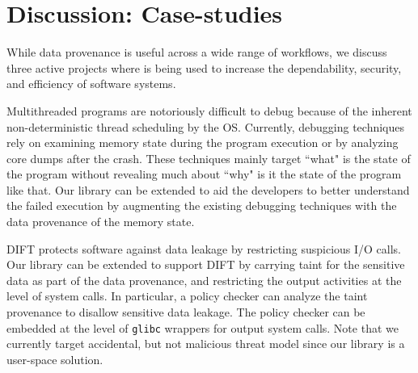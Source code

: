 \section{Discussion: Case-studies}
\label{sec:discussion}
While data provenance is useful across a wide range of workflows, we discuss three active projects where \projecttitle is being used to increase the dependability, security, and efficiency of software systems. 

 Multithreaded programs are notoriously difficult to debug because of the inherent non-deterministic thread scheduling by the OS.  Currently, debugging techniques rely on examining memory state during the program execution or by analyzing core dumps after the crash. These techniques mainly target ``what" is the state of the program without revealing much about ``why" is it the state of the program like that. Our library can be extended to aid the developers to better understand the failed execution by augmenting the existing debugging techniques with the data provenance of the memory state.


%
%
%


 DIFT protects software against data leakage by restricting suspicious I/O calls. Our library can be extended to support DIFT by carrying taint for the sensitive data as part of the data provenance, and  restricting the output activities at the level of system calls. In particular, a policy checker can analyze the taint provenance to disallow sensitive data leakage. The policy checker can be embedded at the level of {\tt glibc} wrappers for output system calls. Note that we currently target accidental, but not malicious threat model since our library is a user-space solution.



